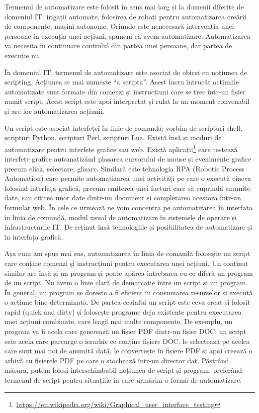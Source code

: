 Termenul de automatizare este folosit în sens mai larg și la domenii diferite de
domeniul IT: irigații automate, folosirea de roboți pentru automatizarea creării
de componente, mașini autonome. Oriunde este nenecesară intervenția unei
persoane în execuția unei acțiuni, spunem că avem automatizare. Automatizarea va
necesita în continuare controlul din partea unei persoane, dar partea de
execuție nu.

În domeniul IT, termenul de automatizare este asociat de obicei cu noțiunea de
scripting. Acțiunea se mai numește “a scripta”. Acest lucru întrucât acțiunile
automatizate sunt formate din comenzi și instrucțiuni care se trec într-un
fișier numit script. Acest script este apoi interpretat și rulat la un moment
convenabil și are loc automatizarea acțiunii.

Un script este asociat interfeței în linie de comandă; vorbim de scripturi
shell, scripturi Python, scripturi Perl, scripturi Lua. Există însă și moduri de
automatizare pentru interfețe grafice sau web. Există
aplicații\footnote{\url{https://en.wikipedia.org/wiki/Graphical_user_interface_testing}}
care testează interfețe grafice automatizând plasarea cursorului de mouse și
evenimente grafice precum click, selectare, glisare. Similară este tehnologia
RPA (Robotic Process Automation) care permite automatizarea unei activități pe
care o execută cineva folosind interfața grafică, precum emiterea unei facturi
care să cuprindă anumite date, sau citirea unor date dintr-un document și
completarea acestora într-un formular web. În cele ce urmează ne vom concentra
pe automatizarea în interfața în linia de comandă, modul uzual de automatizare
în sistemele de operare și infrastructurile IT. De reținut însă tehnologiile și
posibilitatea de automatizare și în interfața grafică.

Așa cum am spus mai sus, automatizarea în linia de comandă folosește un script
care conține comenzi și instrucțiuni pentru executarea unei acțiuni. Un conținut
similar are însă și un program și poate apărea întrebarea cu ce diferă un
program de un script. Nu avem o linie clară de demarcație între un script și un
program. În general, un program se dorește a fi eficient în consumarea
resurselor și execută o acțiune bine determinată. De partea cealaltă un script
este ceva creat și folosit rapid (quick and dirty) și folosește programe deja
existente pentru executarea unei acțiuni combinate, care leagă mai multe
componente. De exemplu, un program va fi acela care generează un fișier PDF
dintr-un fișier DOC; un script este acela care parcurge o ierarhie ce conține
fișiere DOC, le selectează pe acelea care sunt mai noi de anumită dată, le
convertește în fișiere PDF și apoi creează o arhivă cu fișierele PDF pe care o
stochează într-un director dat. Păstrând măsura, putem folosi interschimbabil
noțiunea de script și program, preferând termenul de script pentru situațiile în
care urmărim o formă de automatizare.

